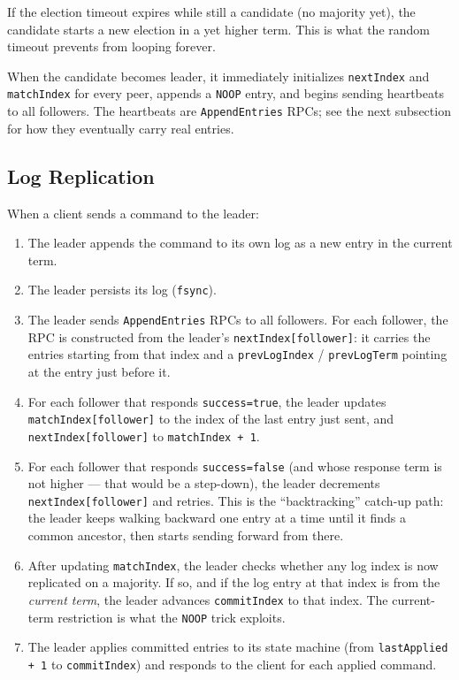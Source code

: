 \documentclass[11pt,a4paper]{article}
\begin{document}
If the election timeout expires while still a candidate (no majority yet), the candidate starts a new election in a yet higher term. This is what the random timeout prevents from looping forever.

When the candidate becomes leader, it immediately initializes \texttt{nextIndex} and \texttt{matchIndex} for every peer, appends a \texttt{NOOP} entry, and begins sending heartbeats to all followers. The heartbeats are \texttt{AppendEntries} RPCs; see the next subsection for how they eventually carry real entries.

\subsection{Log Replication}
When a client sends a command to the leader:

\begin{enumerate}
\item The leader appends the command to its own log as a new entry in the current term.
\item The leader persists its log (\texttt{fsync}).
\item The leader sends \texttt{AppendEntries} RPCs to all followers. For each follower, the RPC is constructed from the leader's \texttt{nextIndex[follower]}: it carries the entries starting from that index and a \texttt{prevLogIndex} / \texttt{prevLogTerm} pointing at the entry just before it.
\item For each follower that responds \texttt{success=true}, the leader updates \texttt{matchIndex[follower]} to the index of the last entry just sent, and \texttt{nextIndex[follower]} to \texttt{matchIndex + 1}.
\item For each follower that responds \texttt{success=false} (and whose response term is not higher --- that would be a step-down), the leader decrements \texttt{nextIndex[follower]} and retries. This is the ``backtracking'' catch-up path: the leader keeps walking backward one entry at a time until it finds a common ancestor, then starts sending forward from there.
\item After updating \texttt{matchIndex}, the leader checks whether any log index is now replicated on a majority. If so, and if the log entry at that index is from the \textit{current term}, the leader advances \texttt{commitIndex} to that index. The current-term restriction is what the \texttt{NOOP} trick exploits.
\item The leader applies committed entries to its state machine (from \texttt{lastApplied + 1} to \texttt{commitIndex}) and responds to the client for each applied command.
\end{enumerate}
\end{document}
